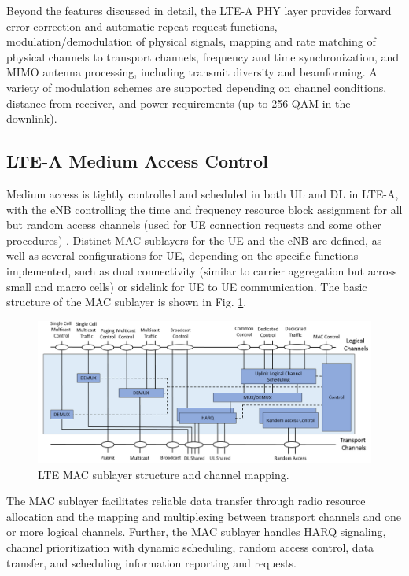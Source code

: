 Beyond the features discussed in detail, the LTE-A PHY layer provides forward error correction and automatic repeat request functions, modulation/demodulation of physical signals, mapping and rate matching of physical channels to transport channels, frequency and time synchronization, and MIMO antenna processing, including transmit diversity and beamforming.  A variety of modulation schemes are supported depending on channel conditions, distance from receiver, and power requirements (up to 256 QAM in the downlink).  

\subsection{LTE-A Medium Access Control}
\label{lte-mac}
Medium access is tightly controlled and scheduled in both UL and DL in LTE-A, with the eNB controlling the time and frequency resource block assignment for all but random access channels (used for UE connection requests and some other procedures) \cite{tr36321}.  Distinct MAC sublayers for the UE and the eNB are defined, as well as several configurations for UE, depending on the specific functions implemented, such as dual connectivity (similar to carrier aggregation but across small and macro cells) or sidelink for UE to UE communication. The basic structure of the MAC sublayer is shown in Fig. \ref{figs:lte-mac}.

\begin{figure}[!ht]
	\centering
	\includegraphics[width=\textwidth]{figures3/LTE-MAC}	\caption{LTE MAC sublayer structure and channel mapping.}
	\label{figs:lte-mac}
\end{figure}
The MAC sublayer facilitates reliable data transfer through radio resource allocation and the mapping and multiplexing between transport channels and one or more logical channels.  Further, the MAC sublayer handles HARQ signaling, channel prioritization with dynamic scheduling, random access control, data transfer, and scheduling information reporting and requests.  

